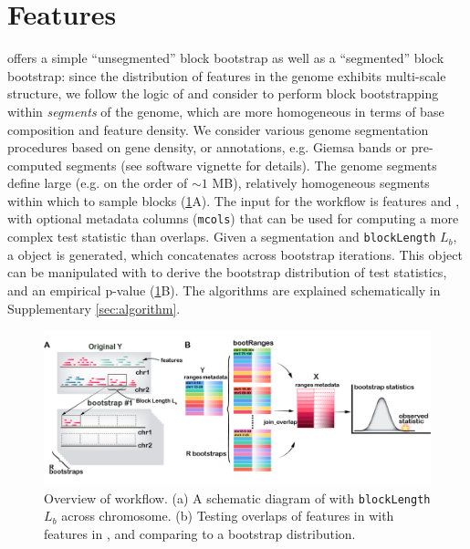 \vspace*{-20pt}

\section{Features}

\bootranges offers a simple ``unsegmented'' block bootstrap as well as
a ``segmented'' block bootstrap:
since the distribution of features in the genome exhibits multi-scale
structure, we follow the logic of \citet{bickel2010subsampling} and consider to
perform block bootstrapping within \textit{segments} of the genome, which are
more homogeneous in terms of base composition and feature density.
We consider various genome segmentation procedures based on gene
density, or annotations, e.g. Giemsa bands or pre-computed segments
(see software vignette for details).
The genome segments define large (e.g. on the order of ${\sim}1$ MB),
relatively homogeneous segments within which to sample blocks
(\cref{fig:framework}A). 
The input for the workflow is \granges features  and
, with optional metadata columns (\texttt{mcols}) that can be
used for computing a more complex test statistic than overlaps.
Given a segmentation and \texttt{blockLength} $L_b$, a \bootranges
object is generated, which concatenates \granges across bootstrap
iterations. This \bootranges object can be manipulated with \plyranges
to derive the bootstrap distribution of test statistics, and an
empirical p-value (\cref{fig:framework}B).
The \bootranges algorithms are explained schematically in Supplementary \cref{sec:algorithm}.

\vspace{-0.3cm}
\begin{figure}[htbp]
\centering%
\setlength{\abovecaptionskip}{-0.05cm}
\includegraphics[scale=0.65]{Figures/bootRanges.jpg}
\caption{Overview of \bootranges workflow. (a) A schematic
  diagram of \bootranges with \texttt{blockLength} $L_b$ across chromosome.
  (b) Testing overlaps of features in  with features in
  , and comparing to a bootstrap distribution.} 
\label{fig:framework}
\vspace{-0.5cm}
\end{figure}

